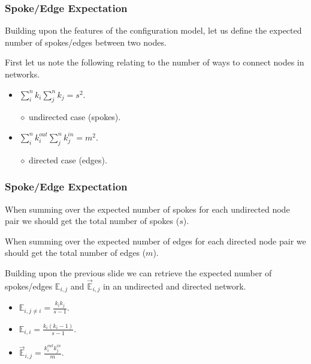 \documentclass{beamer}
\newcommand{\ds}{\displaystyle}
\begin{document}

\begin{frame}

    \frametitle{Spoke/Edge Expectation}

    Building upon the features of the configuration model, let us define the expected number of spokes/edges between two nodes.\pause

    \vspace{2.5mm}
    First let us note the following relating to the number of ways to connect nodes in networks.\pause

    \vspace{2.5mm}
    \begin{itemize}
        \item $ \ds \sum_{i}^{n} k_{i} \sum_{j}^{n} k_{j} = s^{2} $.\pause
        \item[$\diamond$] undirected case (spokes).\pause
        \item $ \ds \sum_{i}^{n} k_{i}^{out} \sum_{j}^{n} k_{j}^{in} = m^{2} $.\pause
        \item[$\diamond$] directed case (edges). 
    \end{itemize}

\end{frame}

\begin{frame}

    \frametitle{Spoke/Edge Expectation}

    When summing over the expected number of spokes for each undirected node pair we should get the total number of spokes ($ s $).\pause 

    \vspace{2.5mm}
    When summing over the expected number of edges for each directed node pair we should get the total number of edges ($ m $).\pause 

    \vspace{2.5mm}
    Building upon the previous slide we can retrieve the expected number of spokes/edges $ \mathbb{E}_{i, j} $ and $ \vec{\mathbb{E}}_{i, j} $ in an undirected and directed network.\pause

    \vspace{2.5mm}
    \begin{itemize}
        \item $ \ds \mathbb{E}_{i, j \ne i} = \frac{k_{i} k_{j}}{s - 1} $.\pause
        \item $ \ds \mathbb{E}_{i, i} = \frac{k_{i} (k_{i} - 1)}{s - 1} $.\pause
        \item $ \ds \vec{\mathbb{E}}_{i, j} = \frac{k_{i}^{out} k_{j}^{in}}{m} $. 
    \end{itemize}

\end{frame}
\end{document}
